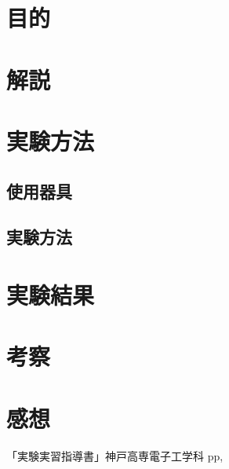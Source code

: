 \documentclass[11pt]{jarticle}
\title{}
\begin{document}
\maketitle

\section{目的}

\section{解説}
	\subsection{}
\section{実験方法}
	\subsection{使用器具}
	\subsection{実験方法}
\section{実験結果}
\section{考察}
\section{感想}
\begin{thebibliography}{99}
「実験実習指導書」神戸高専電子工学科 pp,
\end{thebibliography}
\end{document}
